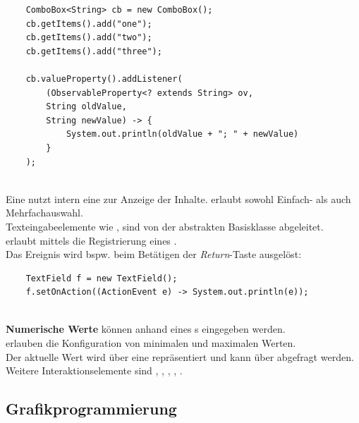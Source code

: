 \begin{verbatim}
    ComboBox<String> cb = new ComboBox();
    cb.getItems().add("one");
    cb.getItems().add("two");
    cb.getItems().add("three");

    cb.valueProperty().addListener(
        (ObservableProperty<? extends String> ov,
        String oldValue,
        String newValue) -> {
            System.out.println(oldValue + "; " + newValue)
        }
    );
\end{verbatim}\\

\noindent
Eine  nutzt intern eine  zur Anzeige der Inhalte.  erlaubt sowohl Einfach- als auch Mehrfachauswahl.\\

\noindent
Texteingabeelemente wie ,  sind von der abstrakten Basisklasse  abgeleitet.\\

\noindent
{} erlaubt mittels  die Registrierung eines .\\
Das Ereignis wird bspw. beim Betätigen der \textit{Return}-Taste ausgelöst:\\


\begin{verbatim}
    TextField f = new TextField();
    f.setOnAction((ActionEvent e) -> System.out.println(e));
\end{verbatim}\\

\noindent
\textbf{Numerische Werte} können anhand eines s eingegeben werden.\\
 erlauben die Konfiguration von minimalen und maximalen Werten.\\
Der aktuelle Wert wird über eine  repräsentiert und kann über  abgefragt werden.\\

\noindent
Weitere Interaktionselemente sind , , , , .


\subsection{Grafikprogrammierung}

